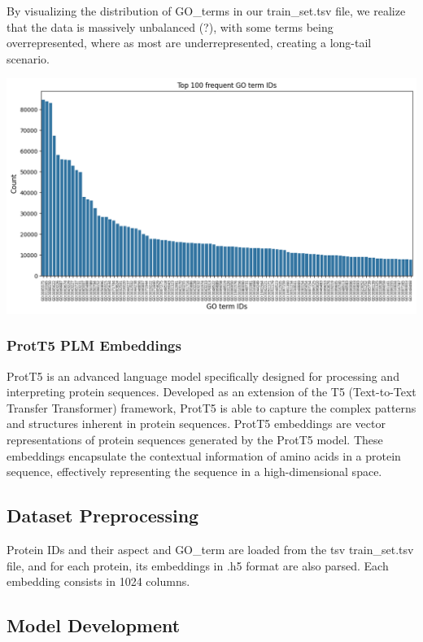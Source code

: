\documentclass[10pt,twocolumn,letterpaper]{article}
\begin{document}
By visualizing the distribution of GO\_terms in our train\_set.tsv file, we realize that the data is massively unbalanced (?), with some terms being overrepresented, where as most are underrepresented, creating a long-tail scenario.

\begin{center}
    \includegraphics[scale=0.25]{img/go_terms_distribution.png} \\
\end{center}


\subsubsection{ProtT5 PLM Embeddings}

ProtT5 is an advanced language model specifically designed for processing and interpreting protein sequences. Developed as an extension of the T5 (Text-to-Text Transfer Transformer) framework, ProtT5 is able to capture the complex patterns and structures inherent in protein sequences.
ProtT5 embeddings are vector representations of protein sequences generated by the ProtT5 model. These embeddings encapsulate the contextual information of amino acids in a protein sequence, effectively representing the sequence in a high-dimensional space.

\subsection{Dataset Preprocessing}

Protein IDs and their aspect and GO\_term are loaded from the tsv train\_set.tsv file, and for each protein, its embeddings in .h5 format are also parsed. Each embedding consists in 1024 columns.


\subsection{Model Development}
\end{document}

